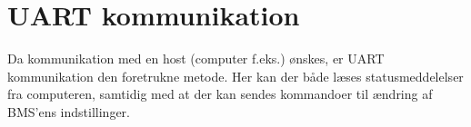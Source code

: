 \section{UART kommunikation}

Da kommunikation med en host (computer f.eks.) ønskes, er UART kommunikation den foretrukne metode. Her kan der både læses statusmeddelelser fra computeren, samtidig med at der kan sendes kommandoer til ændring af BMS'ens indstillinger. \\

